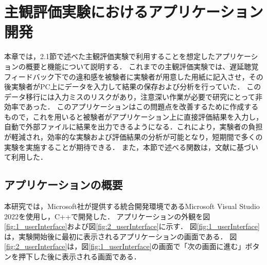 \chapter{主観評価実験におけるアプリケーション開発}
本章では，2.1節で述べた主観評価実験で利用することを想定したアプリケーションの概要と機能について説明する．
これまでの主観評価実験では、遅延聴覚フィードバック下での違和感を被験者に実験者が用意した用紙に記入させ，その後実験者がPC上にデータを入力して結果の保存および分析を行っていた．
このデータ移行には入力ミスのリスクがあり，注意深い作業が必要で研究にとって非効率であった．
このアプリケーションはこの問題点を改善するために作成するもので，これを用いると被験者がアプリケーション上に直接評価結果を入力し，自動で外部ファイルに結果を出力できるようになる．これにより，実験者の負担が軽減され，効率的な実験および評価結果の分析が可能となり，短期間で多くの実験を実施することが期待できる．
また，本節で述べる関数は，文献\cite{Win32API-reference}に基づいて利用した．

\section{アプリケーションの概要}
本研究では，Microsoft社が提供する統合開発環境であるMicrosoft Visual Studio 2022を使用し，C++で開発した．
アプリケーションの外観を図\ref{fig:1_userInterface}および図\ref{fig:2_userInterface}に示す．
図\ref{fig:1_userInterface}は，実験開始後に最初に表示されるアプリケーションの画面である．
図\ref{fig:2_userInterface}は，図\ref{fig:1_userInterface}の画面で「次の画面に進む」ボタンを押下した後に表示される画面である．

